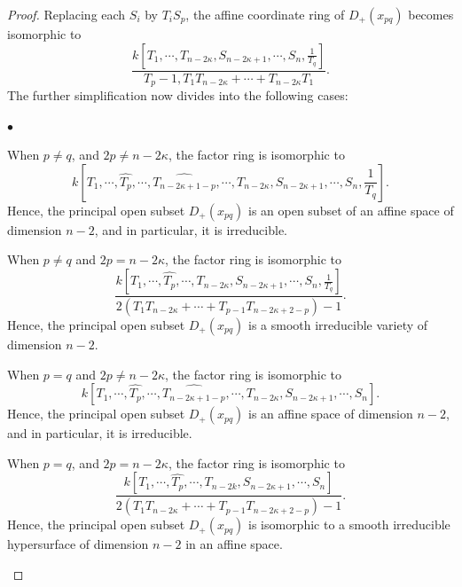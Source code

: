 \documentclass[pdflatex,sn-mathphys-num]{sn-jnl}%
\theoremstyle{thmstyleone}%
\theoremstyle{thmstyletwo}%
\numberwithin{equation}{subsection}
\theoremstyle{thmstylethree}%
\newcommand{\wh}{\widehat}
\newenvironment{altitemize}
	{\begin{list}
			{$\bullet$}
			{\setlength{\labelwidth}{0pt}
				\setlength{\itemindent}{5pt}
				\setlength{\labelsep}{5pt}
				\setlength{\leftmargin}{0pt}
				\setlength{\itemsep}{\the\smallskipamount}
		}}
		{\end{list}}
\begin{document}
\begin{proof}
Replacing each $S_i$ by $T_iS_p$, the affine coordinate ring of $D_+(x_{pq})$ becomes isomorphic to
\begin{equation*}
	\frac{k[T_1,\cdots,T_{n-2\kappa},S_{n-2\kappa+1},\cdots,S_n,\frac{1}{T_q}]}{T_p-1,T_1T_{n-2\kappa}+\cdots+T_{n-2\kappa}T_1}.
\end{equation*}	
The further simplification now divides into the following cases:
\begin{altitemize}
	\item When $p\neq q$, and $2p\neq n-2\kappa$, the factor ring is isomorphic to
	\begin{equation*}
		k[T_1,\cdots,\wh{T_p},\cdots,\wh{T_{n-2\kappa+1-p}},\cdots,T_{n-2\kappa},S_{n-2\kappa+1},\cdots,S_n,\frac{1}{T_q}].
	\end{equation*}
Hence, the principal open subset $D_+(x_{pq})$ is an open subset of an affine space of dimension $n-2$, and in particular, it is irreducible.
					
	\item When $p\neq q$ and $2p=n-2\kappa$, the factor ring is isomorphic to
	\begin{equation*}
		\frac{k[T_1,\cdots,\wh{T_p},\cdots,T_{n-2\kappa},S_{n-2\kappa+1},\cdots,S_n,\frac{1}{T_q}]}{2(T_1T_{n-2\kappa}+\cdots+T_{p-1}T_{n-2\kappa+2-p})-1}.
	\end{equation*}
	Hence, the principal open subset $D_+(x_{pq})$ is a smooth irreducible variety of dimension $n-2$.
	\item When $p=q$ and $2p\neq n-2\kappa$, the factor ring is isomorphic to
	\begin{equation*}
		k[T_1,\cdots,\wh{T_p},\cdots,\wh{T_{n-2\kappa+1-p}},\cdots,T_{n-2\kappa},S_{n-2\kappa+1},\cdots,S_n].
	\end{equation*}
	Hence, the principal open subset $D_+(x_{pq})$ is an affine space of dimension $n-2$, and in particular, it is irreducible.
					
	\item When $p=q$, and $2p=n-2\kappa$, the factor ring is isomorphic to
	\begin{equation*}
		\frac{k[T_1,\cdots,\wh{T_p},\cdots,T_{n-2k},S_{n-2\kappa+1},\cdots,S_n]}{2(T_1T_{n-2\kappa}+\cdots+T_{p-1}T_{n-2\kappa+2-p})-1}.
	\end{equation*}
	Hence, the principal open subset $D_+(x_{pq})$ is isomorphic to a smooth irreducible hypersurface of dimension $n-2$ in an affine space.
\end{altitemize}
				
				
				

\end{proof}
\end{document}
